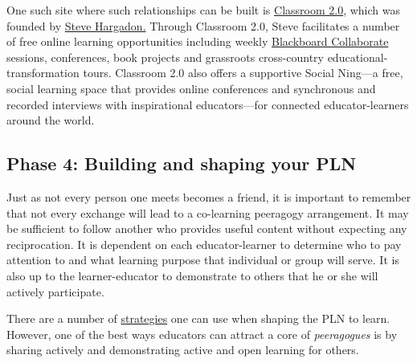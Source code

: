 One such site where such relationships can be built is
\href{http://www.classroom20.com/}{Classroom 2.0}, which was founded by
\href{http://www.stevehargadon.com/}{Steve Hargadon.} Through Classroom
2.0, Steve facilitates a number of free online learning opportunities
including weekly
\href{http://www.google.com/url?q=http\%3A\%2F\%2Fwww.futureofeducation.com\%2Fnotes\%2FPast\_Interviews\&sa=D\&sntz=1\&usg=AFQjCNHVYOvP-w7NTgKp2Fu2AX4YycnPQQ}{Blackboard
Collaborate} sessions, conferences, book projects and grassroots
cross-country educational-transformation tours. Classroom 2.0 also
offers a supportive Social Ning---a free, social learning space that
provides online conferences and synchronous and recorded interviews with
inspirational educators---for connected educator-learners around the
world.

\subsection{Phase 4: Building and shaping your PLN}

Just as not every person one meets becomes a friend, it is important to
remember that not every exchange will lead to a co-learning peeragogy
arrangement. It may be sufficient to follow another who provides useful
content without expecting any reciprocation. It is dependent on each
educator-learner to determine who to pay attention to and what learning
purpose that individual or group will serve. It is also up to the
learner-educator to demonstrate to others that he or she will actively
participate.

There are a number of
\href{http://storify.com/digiphile/how-to-build-a-personal-learning-network-on-twitte}{strategies}
one can use when shaping the PLN to learn. However, one of the best ways
educators can attract a core of \emph{peeragogues} is by sharing
actively and demonstrating active and open learning for others.

